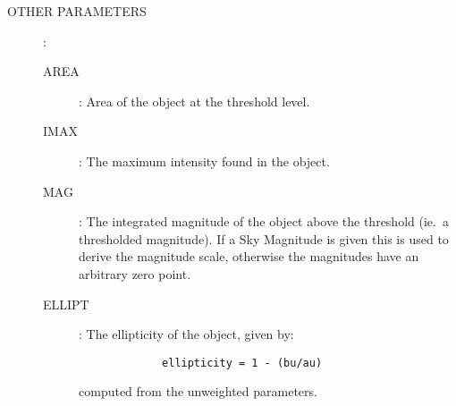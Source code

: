 \begin{description}
\begin{description}
\end{description}
\item [OTHER PARAMETERS]:
\begin{description}
\item [AREA]: Area of the object at the threshold level.
\item [IMAX]: The maximum intensity found in the object.
\item [MAG]: The integrated magnitude of the object above the threshold (ie.\ a
thresholded magnitude).
If a Sky Magnitude is given this is used to derive the magnitude scale,
otherwise the magnitudes have an arbitrary zero point.
\item [ELLIPT]: The ellipticity of the object, given by:
\begin{verbatim}
             ellipticity = 1 - (bu/au)
\end{verbatim}
computed from the unweighted parameters.
\end{description}
\end{description}
